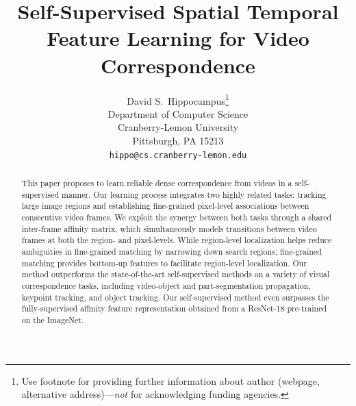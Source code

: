 \documentclass{article}
\title{Self-Supervised Spatial Temporal Feature Learning for Video Correspondence}
\author{%
  David S.~Hippocampus\thanks{Use footnote for providing further information
    about author (webpage, alternative address)---\emph{not} for acknowledging
    funding agencies.} \\
  Department of Computer Science\\
  Cranberry-Lemon University\\
  Pittsburgh, PA 15213 \\
  \texttt{hippo@cs.cranberry-lemon.edu} \\
}
\begin{document}
\maketitle


\begin{abstract}
  This paper proposes to learn reliable dense correspondence from videos in a self-supervised manner. Our learning process integrates two highly related tasks: tracking large image regions and establishing fine-grained pixel-level associations between consecutive video frames. We exploit the synergy between both tasks through a shared inter-frame affinity matrix, which simultaneously models transitions between video frames at both the region- and pixel-levels. While region-level localization helps reduce ambiguities in fine-grained matching by narrowing down search regions; fine-grained matching provides bottom-up features to facilitate region-level localization. Our method outperforms the state-of-the-art self-supervised methods on a variety of visual correspondence tasks, including video-object and part-segmentation propagation, keypoint tracking, and object tracking. Our self-supervised method even surpasses the fully-supervised affinity feature representation obtained from a ResNet-18 pre-trained on the ImageNet.
\end{abstract}
\end{document}
